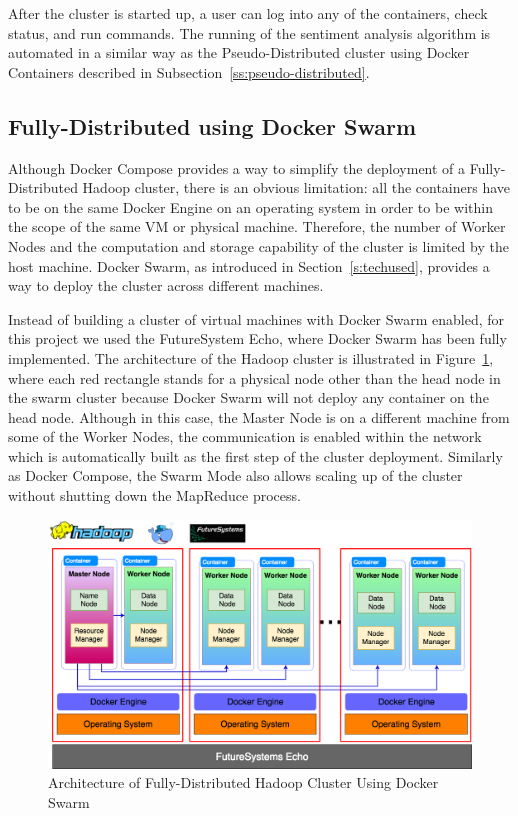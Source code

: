 After the cluster is started up, a user can log into any of the
containers, check status, and run commands. The running of the
sentiment analysis algorithm is automated in a similar way as the
Pseudo-Distributed cluster using Docker Containers described in
Subsection~\ref{ss:pseudo-distributed}.


\subsection{Fully-Distributed using Docker Swarm}

Although Docker Compose provides a way to simplify the deployment of a
Fully-Distributed Hadoop cluster, there is an obvious limitation: all
the containers have to be on the same Docker Engine on an operating
system in order to be within the scope of the same VM or physical
machine. Therefore, the number of Worker Nodes and the computation and
storage capability of the cluster is limited by the host
machine. Docker Swarm, as introduced in Section~\ref{s:techused},
provides a way to deploy the cluster across different machines.

Instead of building a cluster of virtual machines with Docker Swarm
enabled, for this project we used the FutureSystem Echo, where Docker
Swarm has been fully implemented. The architecture of the Hadoop
cluster is illustrated in Figure~\ref{f:hadoop-swarm}, where each red
rectangle stands for a physical node other than the head node in the
swarm cluster because Docker Swarm will not deploy any container on
the head node. Although in this case, the Master Node is on a
different machine from some of the Worker Nodes, the communication is
enabled within the network which is automatically built as the first
step of the cluster deployment.  Similarly as Docker Compose, the
Swarm Mode also allows scaling up of the cluster without shutting down
the MapReduce process.

\begin{figure}[!ht]
	\centering\includegraphics[width=\columnwidth]{images/hadoop-docker-swarm.png}
	\caption{Architecture of Fully-Distributed 
		Hadoop Cluster Using Docker Swarm}\label{f:hadoop-swarm}
\end{figure}

